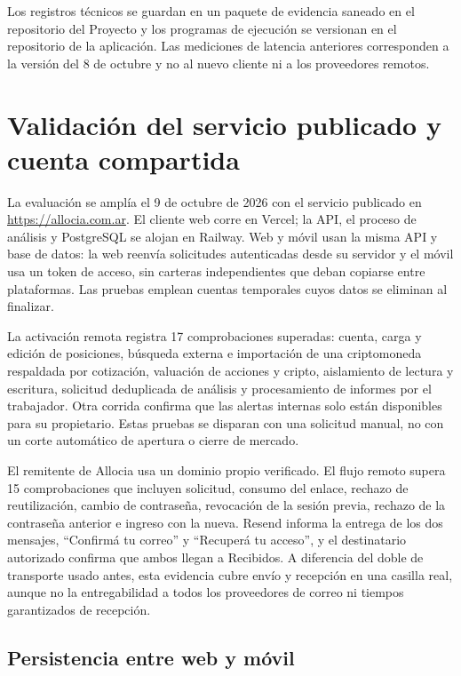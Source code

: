 Los registros técnicos se guardan en un paquete de evidencia saneado en el repositorio del Proyecto y los programas de ejecución se versionan en el repositorio de la aplicación. Las mediciones de latencia anteriores corresponden a la versión del 8 de octubre y no al nuevo cliente ni a los proveedores remotos.


\section{Validación del servicio publicado y cuenta compartida}\label{sec:validacion-publicada}

La evaluación se amplía el 9 de octubre de 2026 con el servicio publicado en \url{https://allocia.com.ar}. El cliente web corre en Vercel; la API, el proceso de análisis y PostgreSQL se alojan en Railway. Web y móvil usan la misma API y base de datos: la web reenvía solicitudes autenticadas desde su servidor y el móvil usa un token de acceso, sin carteras independientes que deban copiarse entre plataformas. Las pruebas emplean cuentas temporales cuyos datos se eliminan al finalizar.

La activación remota registra 17 comprobaciones superadas: cuenta, carga y edición de posiciones, búsqueda externa e importación de una criptomoneda respaldada por cotización, valuación de acciones y cripto, aislamiento de lectura y escritura, solicitud deduplicada de análisis y procesamiento de informes por el trabajador. Otra corrida confirma que las alertas internas solo están disponibles para su propietario. Estas pruebas se disparan con una solicitud manual, no con un corte automático de apertura o cierre de mercado.

El remitente de Allocia usa un dominio propio verificado. El flujo remoto supera 15 comprobaciones que incluyen solicitud, consumo del enlace, rechazo de reutilización, cambio de contraseña, revocación de la sesión previa, rechazo de la contraseña anterior e ingreso con la nueva. Resend informa la entrega de los dos mensajes, \enquote{Confirmá tu correo} y \enquote{Recuperá tu acceso}, y el destinatario autorizado confirma que ambos llegan a Recibidos. A diferencia del doble de transporte usado antes, esta evidencia cubre envío y recepción en una casilla real, aunque no la entregabilidad a todos los proveedores de correo ni tiempos garantizados de recepción.

\subsection{Persistencia entre web y móvil}\label{sec:persistencia-web-movil}


